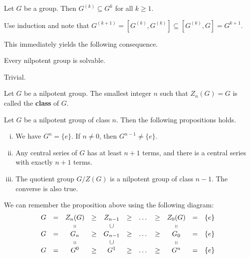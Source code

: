 \begin{lemma}
	Let $G$ be a group. Then $G^{(k)}\subseteq G^k$ for all $k\geq 1$.
\end{lemma}
\begin{sketch}
	Use induction and note that $G^{(k+1)} = [G^{(k)},G^{(k)}] \subseteq [G^{(k)},G]  = G^{k+1}$.
\end{sketch}
This immediately yields the following consequence.
\begin{proposition} \label{prop-nil-implies-sol}
	Every nilpotent group is solvable.
\end{proposition}
\begin{sketch}
	Trivial.
\end{sketch}

\begin{definition}
	Let $G$ be a nilpotent group. The smallest integer $n$ such that $Z_n(G) = G$ is called the \textbf{class} of $G$.
\end{definition}

 
\begin{proposition} \label{prop-nilpotent-class}
	Let $G$ be a nilpotent group of class $n$. Then the following propositions holds.
	\begin{enumerate}[(i)]
		\item We have $G^n = \{e\}$. If $n \neq 0$, then $G^{n-1} \neq \{e\}$.
		\item Any central series of $G$ has at least $n+1$ terms, and there is a central series with exactly $n+1$ terms.
		\item The quotient group $G/Z(G)$ is a nilpotent group of class $n-1$. The converse is also true.
	\end{enumerate}
\end{proposition}
\begin{remark}
	We can remember the proposition above  using the following diagram:
	\begin{equation*}
		\begin{array}{ccccccccccc}
			G&=&Z_n(G) & \geq & Z_{n-1} & \geq & \dots & \geq & Z_0(G) &=& \{e\} \\
			&&\shortparallel & & \cup & & & & \shortparallel&&\\
			G &= &G_n & \geq & G_{n-1} & \geq & \dots & \geq & G_0 &=& \{e\} \\
			&&\shortparallel & & \cup & & & & \shortparallel &&\\
			G &= &G^0 & \geq & G^1 & \geq & \dots & \geq & G^n &=& \{e\}
		\end{array}
	\end{equation*}
\end{remark}

